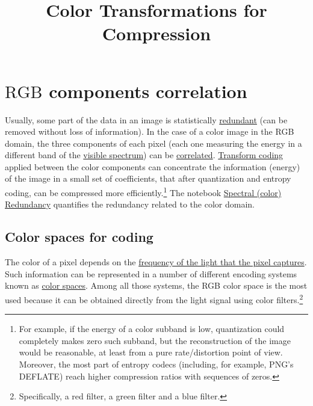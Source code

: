 \title{Color Transformations for Compression}

\maketitle

\tableofcontents

\section{$\text{RGB}$ components correlation}

Usually, some part of the data in an image is statistically
\href{https://en.wikipedia.org/wiki/Data_redundancy}{redundant} (can
be removed without loss of information). In the case of a color image
in the RGB domain, the three components of each pixel (each one
measuring the energy in a different band of the
\href{https://en.wikipedia.org/wiki/Visible_spectrum}{visible
  spectrum}) can be
\href{https://en.wikipedia.org/wiki/Correlation_and_dependence}{correlated}.
\href{https://vicente-gonzalez-ruiz.github.io/transform_coding/}{Transform
  coding} applied between the color components can concentrate the
information (energy) of the image in a small set of coefficients, that
after quantization and entropy coding, can be compressed more
efficiently.\footnote{For example, if the energy of a color subband is
low, quantization could completely makes zero such subband, but the
reconstruction of the image would be reasonable, at least from a pure
rate/distortion point of view. Moreover, the most part of entropy codecs
(including, for example, PNG's DEFLATE) reach higher compression
ratios with sequences of zeros.} The notebook
\href{https://github.com/vicente-gonzalez-ruiz/color_transforms/blob/main/docs/color_redundancy.ipynb}{Spectral (color) Redundancy}
quantifies the redundancy related to the color domain.


\subsection{Color spaces for coding}

The color of a pixel depends on the
\href{https://en.wikipedia.org/wiki/Visible_spectrum}{frequency of the
  light that the pixel captures}. Such information can be represented
in a number of different encoding systems known as
\href{https://en.wikipedia.org/wiki/Color_space}{color spaces}. Among
all those systems, the RGB color space is the most used because it can
be obtained directly from the light signal using color
filters.\footnote{Specifically, a red filter, a green filter and a
blue filter.}

